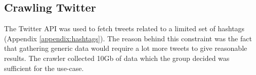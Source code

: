\subsection{Crawling Twitter}

The Twitter API \cite{twitterapi} was used to fetch tweets related to a limited
set of hashtags (Appendix \ref{appendix:hashtags}). The reason behind this constraint
was the fact that gathering generic data would require a lot more tweets to
give reasonable results. The crawler collected 10Gb of data which the group 
decided was sufficient for the use-case.



